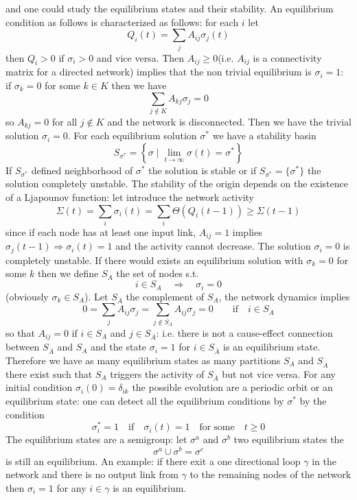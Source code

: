 and one could study the equilibrium states and their stability. An equilibrium condition as follows is characterized as follows:
for each $i$ let
$$
Q_i(t)=\sum_j A_{ij}\sigma_j(t) 
$$
then $Q_i>0$ if $\sigma_i>0$ and vice versa.  Then $A_{ij}\ge 0$(i.e. $A_{ij}$ is a connectivity matrix for a directed network) 
implies that the non trivial equilibrium is $\sigma_i=1$: if $\sigma_k=0$ for some $k\in K$ then we have
$$
\sum_{j\notin K} A_{kj}\sigma_j=0
$$
so $A_{kj}=0$ for all $j\notin K$ and the network is disconnected. Then we have the trivial solution $\sigma_i=0$. For each equilibrium solution $\sigma^\ast$ we have a stability basin
$$
S_{\sigma^\ast}=\left \{\sigma \; | \; \lim_{t\to\infty} \sigma(t)=\sigma^\ast\right \}
$$
If $S_{\sigma^\ast}$ defined neighborhood of $\sigma^\ast$ the solution is stable or if $S_{\sigma^\ast}=\{\sigma^\ast\}$ the solution completely unstable. 
The stability of the origin depends on the existence of a Ljapounov function: let introduce the network activity
$$
\Sigma(t)=\sum_i \sigma_i(t)=\sum_i \Theta(Q_i(t-1))\ge \Sigma(t-1)
$$
since if each node has at least one input link, $A_{ij}=1$ implies $\sigma_j(t-1)\Rightarrow \sigma_i(t)=1$ and the activity cannot decrease. The solution $\sigma_i=0$
is completely unstable. If there would exists an equilibrium solution with $\sigma_k=0$ for some $k$ then we define $S_A$ the set of nodes s.t.
$$
i\in S_A\quad \Rightarrow \quad \sigma_i=0
$$
(obviously $\sigma_k\in S_A$). Let $S_{\bar A}$ the complement of $S_A$, the network dynamics implies
$$
0=\sum_j A_{ij}\sigma_j=\sum_{j\notin S_A} A_{ij}\sigma_j=0 \qquad \textrm{if}\quad i\in S_A
$$
so that $A_{ij}=0$ if $i\in S_A$ and $j\in S_{\bar A}$: i.e. there is not a cause-effect connection between $S_{\bar A}$ and $S_A$ and the state $\sigma_i=1$ for $i\in S_{\bar A}$
is an equilibrium state. Therefore we have as many equilibrium states as many partitions $S_A$ and $S_{\bar A}$ there exist such that $S_A$ triggers the activity of $S_{\bar A}$
but not vice versa. For any initial condition $\sigma_i(0)=\delta_{ik}$ the possible evolution are a periodic orbit or an equilibrium state: one can detect all the equilibrium conditions
by $\sigma^\ast$ by the condition
$$
\sigma_i^\ast=1\quad \textrm{if}\quad \sigma_i(t)=1\quad \textrm{for}\;\textrm{some}\quad t\ge 0
$$
The equilibrium states are a semigroup: let $\sigma^a$ and $\sigma^b$ two equilibrium states the
$$
\sigma^a\cup \sigma^b=\sigma^c
$$
is still an equilibrium. An example: if there exit a one directional loop $\gamma$ in the network and there is no output link
from $\gamma$ to the remaining nodes of the network then $\sigma_i=1$ for any $i\in \gamma$ is an equilibrium.
